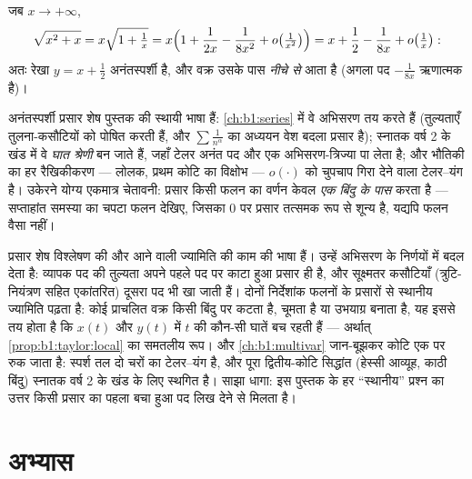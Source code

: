 \begin{example}[प्रसार से अनंतस्पर्शी रेखा]\label{ex:b1:taylor:asymptote}
जब $x \to +\infty$,
\[
\sqrt{x^2 + x} = x\sqrt{1 + \tfrac1x}
= x\Bigl(1 + \frac{1}{2x} - \frac{1}{8x^2} + o\bigl(\tfrac{1}{x^2}\bigr)\Bigr)
= x + \frac12 - \frac{1}{8x} + o\bigl(\tfrac 1x\bigr):
\]
अतः रेखा $y = x + \frac12$ अनंतस्पर्शी है, और वक्र उसके पास \emph{नीचे से}
आता है (अगला पद $-\frac{1}{8x}$ ऋणात्मक है)।
\end{example}

\begin{remark}[प्रसार आगे कहाँ काम करते हैं]
अनंतस्पर्शी प्रसार शेष पुस्तक की स्थायी भाषा हैं: \cref{ch:b1:series} में वे
अभिसरण तय करते हैं (तुल्यताएँ तुलना-कसौटियों को पोषित करती हैं, और $\sum
\frac{1}{n^\alpha}$ का अध्ययन वेश बदला प्रसार है); स्नातक वर्ष 2 के खंड में
वे \emph{घात श्रेणी} बन जाते हैं, जहाँ टेलर  अनंत पद और एक
अभिसरण-त्रिज्या पा लेता है; और भौतिकी का हर रैखिकीकरण --- लोलक, प्रथम कोटि
का विक्षोभ --- $o(\cdot)$ को चुपचाप गिरा देने वाला टेलर--यंग  है। उकेरने
योग्य एकमात्र चेतावनी: प्रसार किसी फलन का वर्णन केवल \emph{एक बिंदु के पास}
करता है --- सप्ताहांत समस्या का चपटा फलन देखिए, जिसका $0$ पर प्रसार तत्समक
रूप से शून्य है, यद्यपि फलन वैसा नहीं।
\end{remark}

\begin{remark}[इस खंड के भीतर आगे की दृष्टि]
प्रसार शेष विश्लेषण की और आने वाली ज्यामिति की काम की भाषा हैं।
 उन्हें अभिसरण के निर्णयों में बदल देता है: व्यापक पद की
तुल्यता अपने पहले पद पर काटा हुआ प्रसार ही है, और सूक्ष्मतर कसौटियाँ
(त्रुटि-नियंत्रण सहित एकांतरित) दूसरा पद भी खा जाती हैं। 
दोनों निर्देशांक फलनों के प्रसारों से स्थानीय ज्यामिति पढ़ता है: कोई
प्राचलित वक्र किसी बिंदु पर कटता है, चूमता है या उभयाग्र बनाता है, यह इससे
तय होता है कि $x(t)$ और $y(t)$ में $t$ की कौन-सी घातें बच रहती हैं ---
अर्थात् \cref{prop:b1:taylor:local} का समतलीय रूप। और \cref{ch:b1:multivar}
जान-बूझकर कोटि एक पर रुक जाता है: स्पर्श तल दो चरों का टेलर--यंग  है, और
पूरा द्वितीय-कोटि सिद्धांत (हेस्सी आव्यूह, काठी बिंदु) स्नातक वर्ष 2 के खंड
के लिए स्थगित है। साझा धागा: इस पुस्तक के हर ``स्थानीय'' प्रश्न का उत्तर
किसी प्रसार का पहला बचा हुआ पद लिख देने से मिलता है।
\end{remark}

\section{अभ्यास}

